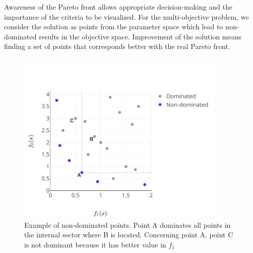         Awareness of the Pareto front allows appropriate decision-making and the importance of the criteria to be visualized. For the multi-objective problem, we consider the solution as points from the parameter space which lead to non-dominated results in the objective space. Improvement of the solution means finding a set of points that corresponds better with the real Pareto front.

        \begin{figure}
            \centering 
            \includegraphics[width=10cm]{content/images/ndom}
            \caption[Non-dominated points]{Example of non-dominated points. Point A dominates all points in the internal sector where B is located. Concerning point A, point C is not dominant because it has better value in $f_1$} 
            \label{fig:dominated} 
        \end{figure}



